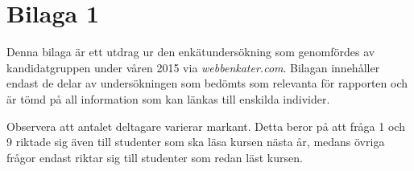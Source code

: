 \documentclass[12pt,a4paper,twoside,openright]{article}
\begin{document}

\section{Bilaga 1}
\label{bil:1}
Denna bilaga är ett utdrag ur den enkätundersökning som genomfördes av
kandidatgruppen under våren 2015 via \textit{webbenkater.com}. Bilagan
innehåller endast de delar av undersökningen som bedömts som relevanta
för rapporten och är tömd på all information som kan länkas till
enskilda individer.

Observera att antalet deltagare varierar markant. Detta beror på att
 fråga 1 och 9 riktade sig även till studenter som ska läsa kursen nästa
år, medans övriga frågor endast riktar sig till studenter som redan läst
kursen.
\end{document}
